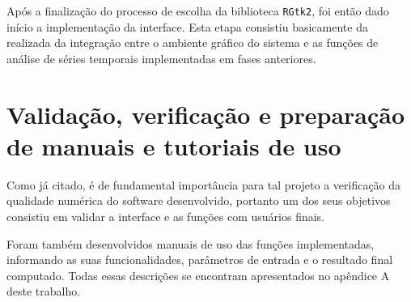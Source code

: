 Após a finalização do processo de escolha da biblioteca \texttt{RGtk2}, foi então dado início a implementação da interface.
Esta etapa consistiu basicamente da realizada da integração entre o ambiente gráfico do sistema e as funções de análise de séries temporais implementadas em fases anteriores.

\section{Validação, verificação e preparação de manuais e tutoriais de uso}

Como já citado, é de fundamental importância para tal projeto a verificação da qualidade numérica do software desenvolvido, portanto um dos seus objetivos consistiu em validar a interface e as funções com usuários finais.

Foram também desenvolvidos manuais de uso das funções implementadas, informando as suas funcionalidades, parâmetros de entrada e o resultado final computado. Todas essas descrições se encontram apresentados no apêndice A deste trabalho.
